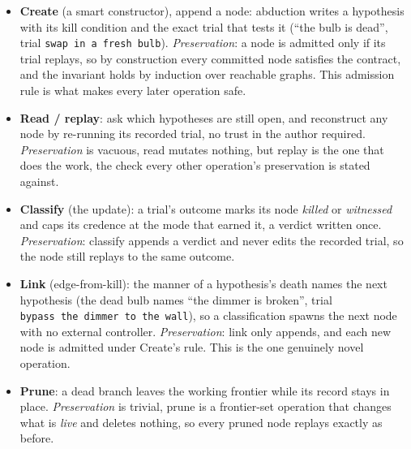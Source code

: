 \documentclass[
  10pt,
]{article}
\providecommand{\tightlist}{%
  \setlength{\itemsep}{0pt}\setlength{\parskip}{0pt}}
\begin{document}
\begin{itemize}
\tightlist
\item
  \textbf{Create} (a smart constructor), append a node: abduction writes
  a hypothesis with its kill condition and the exact trial that tests it
  (``the bulb is dead'', trial \texttt{swap\ in\ a\ fresh\ bulb}).
  \emph{Preservation}: a node is admitted only if its trial replays, so
  by construction every committed node satisfies the contract, and the
  invariant holds by induction over reachable graphs. This admission
  rule is what makes every later operation safe.
\item
  \textbf{Read / replay}: ask which hypotheses are still open, and
  reconstruct any node by re-running its recorded trial, no trust in the
  author required. \emph{Preservation} is vacuous, read mutates nothing,
  but replay is the one that does the work, the check every other
  operation's preservation is stated against.
\item
  \textbf{Classify} (the update): a trial's outcome marks its node
  \emph{killed} or \emph{witnessed} and caps its credence at the mode
  that earned it, a verdict written once. \emph{Preservation}: classify
  appends a verdict and never edits the recorded trial, so the node
  still replays to the same outcome.
\item
  \textbf{Link} (edge-from-kill): the manner of a hypothesis's death
  names the next hypothesis (the dead bulb names ``the dimmer is
  broken'', trial \texttt{bypass\ the\ dimmer\ to\ the\ wall}), so a
  classification spawns the next node with no external controller.
  \emph{Preservation}: link only appends, and each new node is admitted
  under Create's rule. This is the one genuinely novel operation.
\item
  \textbf{Prune}: a dead branch leaves the working frontier while its
  record stays in place. \emph{Preservation} is trivial, prune is a
  frontier-set operation that changes what is \emph{live} and deletes
  nothing, so every pruned node replays exactly as before.
\end{itemize}
\end{document}

